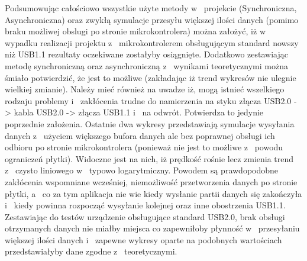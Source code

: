 \documentclass{BscUS}
\newcommand\blankpage{%
    \null
    \thispagestyle{empty}%
    \newpage}
\begin{document}
\indent Podsumowując całościowo wszystkie użyte metody w~ projekcie (Synchroniczna, Asynchroniczna) oraz zwykłą symulacje przesyłu większej ilości danych (pomimo braku możliwej obslugi po stronie mikrokontrolera) można założyć, iż w~ wypadku realizacji projektu z~ mikrokontrolerem obsługującym standard nowszy niż USB1.1 rezultaty oczekiwane zostałyby osiągnięte. Dodatkowo zestawiając metodę synchroniczną oraz asynchroniczną z~ wynikami teoretycznymi można śmiało potwierdzić, że jest to możliwe (zakładając iż trend wykresów nie ulegnie wielkiej zmianie). Należy mieć również na uwadze iż, mogą istnieć wszelkiego rodzaju problemy i~ zakłócenia trudne do namierzenia na styku złącza USB2.0 -> kabla USB2.0 -> złącza USB1.1 i~ na odwrót. Potwierdza to jedynie poprzednie założenia. Ostatnie dwa wykresy przedstawiają symulacje wysyłania danych z~ użyciem większego bufora danych ale bez poprawnej obsługi ich odbioru po stronie mikrokontrolera (ponieważ nie jest to możliwe z~ powodu ograniczeń płytki). Widoczne jest na nich, iż prędkość rośnie lecz zmienia trend z~ czysto liniowego w~ typowo logarytmiczny. Powodem są prawdopodobne zakłócenia wspomniane wcześniej, niemożliwość przetworzenia danych po stronie płytki, a~ co za tym aplikacja nie wie kiedy wysłanie partii danych się zakończyła i~ kiedy powinna rozpocząć wysyłanie kolejnej oraz inne obostrzenia USB1.1. Zestawiając do testów urządzenie obsługujące standard USB2.0, brak obsługi otrzymanych danych nie miałby miejsca co zapewniłoby płynność w~ przesyłaniu większej ilości danych i~ zapewne wykresy oparte na podobnych wartościach przedstawiałyby dane zgodne z~ teoretycznymi.

\afterpage{\blankpage}
\end{document}
